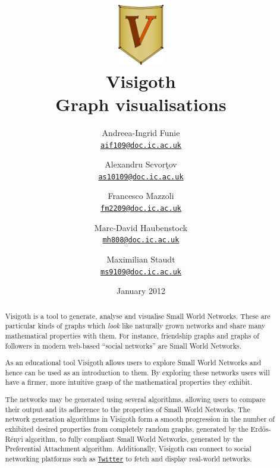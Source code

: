 \documentclass[a4paper,11pt,titlepage]{article}
\let\stdhref\href
\renewcommand{\href}[2]{\stdhref{#1}{\texttt{#2}}}
\newcommand{\mailto}[1]{\href{mailto:#1}{#1}}
\newcommand{\Twitter}{\href{http://twitter.com}{Twitter} }
\begin{document}
\title{\includegraphics[width=2cm]{v.png}\\
  \Huge Visigoth\\\Large Graph visualisations}
\author{
  Andreea-Ingrid Funie\\\mailto{aif109@doc.ic.ac.uk}\and
  Alexandru Scvor\c tov\\\mailto{as10109@doc.ic.ac.uk}\and
  Francesco Mazzoli\\\mailto{fm2209@doc.ic.ac.uk}\and
  Marc-David Haubenstock\\\mailto{mh808@doc.ic.ac.uk}\and
  Maximilian Staudt\\\mailto{ms9109@doc.ic.ac.uk}
}
\date{January 2012}
\maketitle

\begin{abstract}
Visigoth is a tool to generate, analyse and visualise Small World
Networks. These are particular kinds of graphs which \emph{look} like naturally
grown networks and share many mathematical properties with them.  For instance,
friendship graphs and graphs of followers in modern web-based ``social
networks'' are Small World Networks.

As an educational tool Visigoth allows users to explore Small World Networks and
hence can be used as an introduction to them. By exploring these networks users
will have a firmer, more intuitive grasp of the mathematical properties they
exhibit.

The networks may be generated using several algorithms, allowing users to
compare their output and its adherence to the properties of Small World
Networks. The network generation algorithms in Visigoth form a smooth
progression in the number of exhibited desired properties from completely random
graphs, generated by the Erd\H{o}s-R\'{e}nyi algorithm, to fully compliant Small
World Networks, generated by the Preferential Attachment
algorithm. Additionally, Visigoth can connect to social networking platforms
such as \Twitter to fetch and display real-world networks.
\end{abstract}
\end{document}
